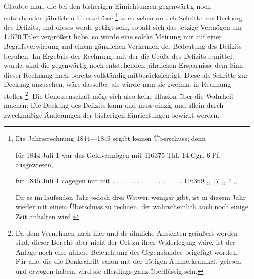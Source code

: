 Glaubte man, die bei den bisherigen Einrichtungen gegenwärtig noch entstehenden jährlichen Überschüsse {\renewcommand{\thefootnote}{**)}\footnote{Die Jahresrechnung 1844—1845 ergibt keinen Überschuss; denn
\par\noindent für 1844 Juli 1 war das Geldvermögen mit 116375 Thl. 14 Ggr. 6 Pf. ausgewiesen,
\par\noindent für 1845 Juli 1 dagegen nur mit . . . . . . . . . . . . . . . . . 116369 ,, 17 ,, 4 ,,
\par\noindent Da es im laufenden Jahr jedoch drei Witwen weniger gibt, ist in diesem Jahr wieder mit einem Überschuss zu rechnen, der wahrscheinlich auch noch einige Zeit anhalten wird.}} seien schon an sich Schritte zur Deckung des Defizits, und dieses werde getilgt sein, sobald sich das jetzige Vermögen um 17520 Taler vergrößert habe, so würde eine solche Meinung nur auf einer Begriffsverwirrung und einem gänzlichen Verkennen der Bedeutung des Defizits beruhen. Im Ergebnis der Rechnung, mit der die Größe des Defizits ermittelt wurde, sind die gegenwärtig noch entstehenden jährlichen Ersparnisse dem Sinn dieser Rechnung nach bereits vollständig mitberücksichtigt. Diese als Schritte zur Deckung anzusehen, wäre dasselbe, als würde man sie zweimal in Rechnung stellen {\renewcommand{\thefootnote}{***)}\footnote{Da dem Vernehmen nach hier und da ähnliche Ansichten geäußert worden sind, dieser Bericht aber nicht der Ort zu ihrer Widerlegung wäre, ist der Anlage noch eine nähere Beleuchtung des Gegenstandes beigefügt worden. Für alle, die die Denkschrift schon mit der nötigen Aufmerksamkeit gelesen und erwogen haben, wird sie allerdings ganz überflüssig sein.}}. Die Genossenschaft möge sich also keine Illusion über die Wahrheit
machen: Die Deckung des Defizits kann und muss einzig und allein durch zweckmäßige Änderungen der bisherigen Einrichtungen bewirkt werden.

